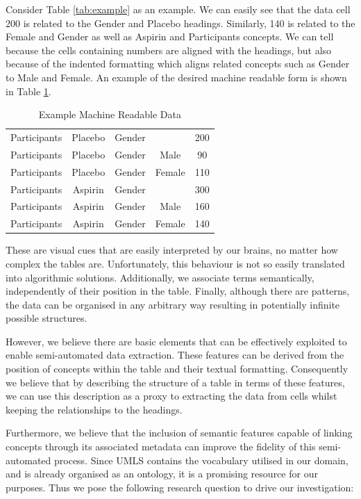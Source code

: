 \documentclass[10.7pt,]{article}
\begin{document}
Consider Table \ref{tab:example} as an example. We can easily see that the data cell 200 is related to the Gender and Placebo headings. Similarly, 140 is related to the Female and Gender as well as Aspirin and Participants concepts. We can tell because the cells containing numbers are aligned with the headings, but also because of the indented formatting which aligns related concepts such as Gender to Male and Female. An example of the desired machine readable form is shown in Table \ref{tab:machine}.

\begin{table}[h!]
	\centering
	
	\begin{tabular}{|c|c|c|c|c|}
		\hline 

Participants & Placebo & Gender & & 200 \\
Participants & Placebo & Gender & Male & 90 \\
Participants & Placebo & Gender & Female & 110 \\
Participants & Aspirin & Gender & & 300 \\
Participants & Aspirin & Gender & Male & 160 \\
Participants & Aspirin & Gender & Female & 140 \\
		
		\hline 
	\end{tabular} 
	
	\caption{\label{tab:machine} Example Machine Readable Data }
\end{table}

These are visual cues that are easily interpreted by our brains, no matter how complex the tables are. Unfortunately, this behaviour is not so easily translated into algorithmic solutions. Additionally, we associate terms semantically, independently of their position in the table. Finally, although there are patterns, the data can be organised in any arbitrary way resulting in potentially infinite possible structures.

However, we believe there are basic elements that can be effectively exploited to enable semi-automated data extraction. These features can be derived from the position of concepts within the table and their textual formatting. Consequently we believe that by describing the structure of a table in terms of these features, we can use this description as a proxy to extracting the data from cells whilst keeping the relationships to the headings.

Furthermore, we believe that the inclusion of semantic features capable of linking concepts through its associated metadata can improve the fidelity of this semi-automated process. Since UMLS contains the vocabulary utilised in our domain, and is already organised as an ontology, it is a promising resource for our purposes. Thus we pose the following research question to drive our investigation: 
\end{document}
